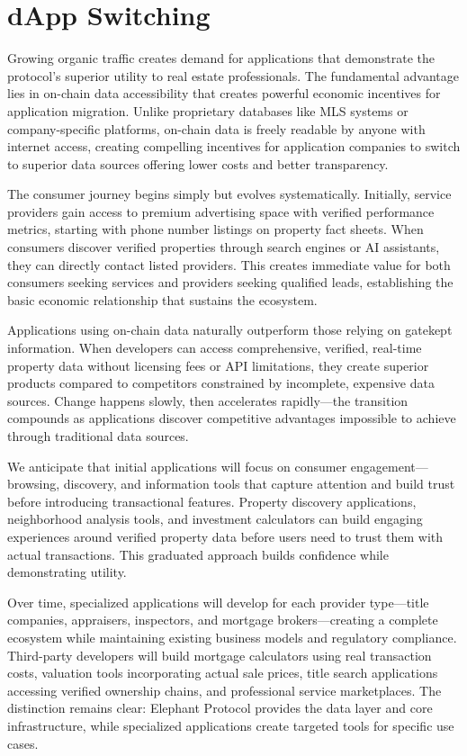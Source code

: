 \section{dApp Switching}

Growing organic traffic creates demand for applications that demonstrate the protocol's superior utility to real estate professionals. The fundamental advantage lies in on-chain data accessibility that creates powerful economic incentives for application migration. Unlike proprietary databases like MLS systems or company-specific platforms, on-chain data is freely readable by anyone with internet access, creating compelling incentives for application companies to switch to superior data sources offering lower costs and better transparency.

The consumer journey begins simply but evolves systematically. Initially, service providers gain access to premium advertising space with verified performance metrics, starting with phone number listings on property fact sheets. When consumers discover verified properties through search engines or AI assistants, they can directly contact listed providers. This creates immediate value for both consumers seeking services and providers seeking qualified leads, establishing the basic economic relationship that sustains the ecosystem.

Applications using on-chain data naturally outperform those relying on gatekept information. When developers can access comprehensive, verified, real-time property data without licensing fees or API limitations, they create superior products compared to competitors constrained by incomplete, expensive data sources. Change happens slowly, then accelerates rapidly---the transition compounds as applications discover competitive advantages impossible to achieve through traditional data sources.

We anticipate that initial applications will focus on consumer engagement---browsing, discovery, and information tools that capture attention and build trust before introducing transactional features. Property discovery applications, neighborhood analysis tools, and investment calculators can build engaging experiences around verified property data before users need to trust them with actual transactions. This graduated approach builds confidence while demonstrating utility.

Over time, specialized applications will develop for each provider type---title companies, appraisers, inspectors, and mortgage brokers---creating a complete ecosystem while maintaining existing business models and regulatory compliance. Third-party developers will build mortgage calculators using real transaction costs, valuation tools incorporating actual sale prices, title search applications accessing verified ownership chains, and professional service marketplaces. The distinction remains clear: Elephant Protocol provides the data layer and core infrastructure, while specialized applications create targeted tools for specific use cases.

